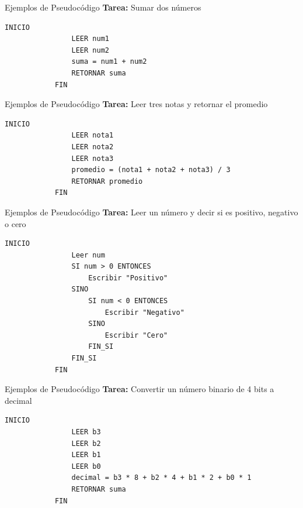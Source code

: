 \documentclass{beamer}
\begin{document}
    \begin{frame}[fragile]{Ejemplos de Pseudocódigo}
        \textbf{Tarea:} Sumar dos números
        \begin{lstlisting}[language=PseudocodigoES]
            INICIO
                LEER num1
                LEER num2
                suma = num1 + num2
                RETORNAR suma
            FIN
        \end{lstlisting}
    \end{frame}

    \begin{frame}[fragile]{Ejemplos de Pseudocódigo}
        \textbf{Tarea:} Leer tres notas y retornar el promedio
        \begin{lstlisting}[language=PseudocodigoES]
            INICIO
                LEER nota1
                LEER nota2
                LEER nota3
                promedio = (nota1 + nota2 + nota3) / 3
                RETORNAR promedio
            FIN
        \end{lstlisting}
    \end{frame}

    \begin{frame}[fragile]{Ejemplos de Pseudocódigo}
        \textbf{Tarea:} Leer un número y decir si es positivo, negativo o cero
        \begin{lstlisting}[language=PseudocodigoES]
            INICIO
                Leer num
                SI num > 0 ENTONCES
                    Escribir "Positivo"
                SINO
                    SI num < 0 ENTONCES
                        Escribir "Negativo"
                    SINO
                        Escribir "Cero"
                    FIN_SI
                FIN_SI
            FIN
        \end{lstlisting}
    \end{frame}

    \begin{frame}[fragile]{Ejemplos de Pseudocódigo}
        \textbf{Tarea:} Convertir un número binario de 4 bits a decimal
        \begin{lstlisting}[language=PseudocodigoES]
            INICIO
                LEER b3
                LEER b2
                LEER b1
                LEER b0
                decimal = b3 * 8 + b2 * 4 + b1 * 2 + b0 * 1
                RETORNAR suma
            FIN
        \end{lstlisting}
    \end{frame}
\end{document}
